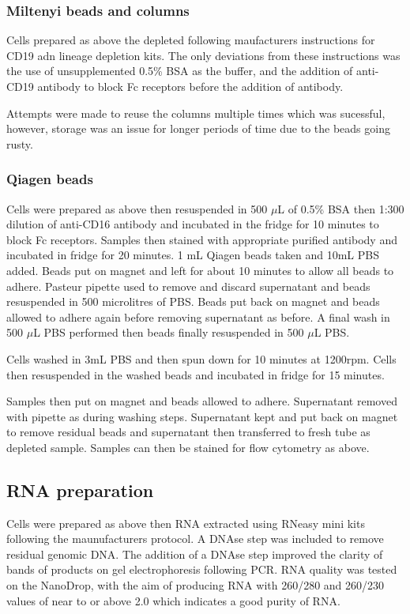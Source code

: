 \subsubsection{Miltenyi beads and columns}

Cells prepared as above the depleted following maufacturers instructions for CD19 adn lineage depletion kits.
The only deviations from these instructions was the use of unsupplemented 0.5\% BSA as the buffer, and the addition of anti-CD19 antibody to block Fc receptors before the addition of antibody.

Attempts were made to reuse the columns multiple times which was sucessful, however, storage was an issue for longer periods of time due to the beads going rusty.

\subsubsection{Qiagen beads}

Cells were prepared as above then resuspended in 500 $\mu$L of 0.5\% BSA then 1:300 dilution of anti-CD16 antibody and incubated in the fridge for 10 minutes to block Fc receptors.
Samples then stained with appropriate purified antibody and incubated in fridge for 20 minutes.
1 mL Qiagen beads taken and 10mL PBS added.
Beads put on magnet and left for about 10 minutes to allow all beads to adhere.
Pasteur pipette used to remove and discard supernatant and beads resuspended in 500 microlitres of PBS.
Beads put back on magnet and beads allowed to adhere again before removing supernatant as before.
A final wash in 500 $\mu$L PBS performed then beads finally resuspended in 500 $\mu$L PBS.

Cells washed in 3mL PBS and then spun down for 10 minutes at 1200rpm.
Cells then resuspended in the washed beads and incubated in fridge for 15 minutes.

Samples then put on magnet and beads allowed to adhere.
Supernatant removed with pipette as during washing steps.
Supernatant kept and put back on magnet to remove residual beads and supernatant then transferred to fresh tube as depleted sample.
Samples can then be stained for flow cytometry as above.

\subsection{RNA preparation}

Cells were prepared as above then RNA extracted using RNeasy mini kits following the maunufacturers protocol.
A DNAse step was included to remove residual genomic DNA.
The addition of a DNAse step improved the clarity of bands of products on gel electrophoresis following PCR.
RNA quality was tested on the NanoDrop, with the aim of producing RNA with 260/280 and 260/230 values of near to or above 2.0 which indicates a good purity of RNA.

